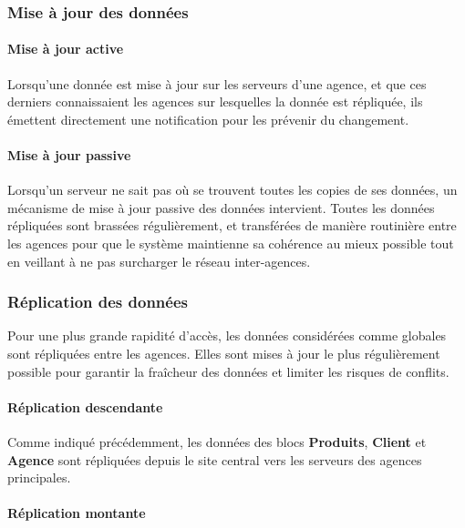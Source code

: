 \subsubsection{Mise à jour des données}

\paragraph{Mise à jour active}

Lorsqu'une donnée est mise à jour sur les serveurs d'une agence, et que ces derniers connaissaient les
agences sur lesquelles la donnée est répliquée, ils émettent directement une notification pour les
prévenir du changement.

\paragraph{Mise à jour passive}

Lorsqu'un serveur ne sait pas où se trouvent toutes les copies de ses données, un mécanisme de mise à
jour passive des données intervient. Toutes les données répliquées sont brassées régulièrement,
et transférées de manière routinière entre les agences pour que le système maintienne sa cohérence au
mieux possible tout en veillant à ne pas surcharger le réseau inter-agences.

\subsubsection{Réplication des données}

Pour une plus grande rapidité d'accès, les données considérées comme globales sont répliquées entre les
agences. Elles sont mises à jour le plus régulièrement possible pour garantir la fraîcheur des données
et limiter les risques de conflits.

\paragraph{Réplication descendante}

Comme indiqué précédemment, les données des blocs \textbf{Produits}, \textbf{Client} et \textbf{Agence}
sont répliquées depuis le site central vers les serveurs des agences principales.

\paragraph{Réplication montante}

